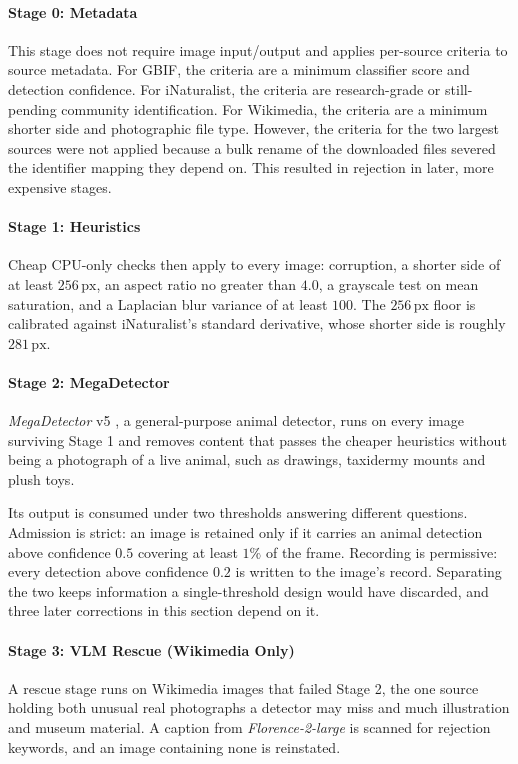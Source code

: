 \paragraph{Stage 0: Metadata}
This stage does not require image input/output and applies per-source criteria to source metadata. For GBIF, the criteria are a minimum classifier score and detection confidence. For iNaturalist, the criteria are research-grade or still-pending community identification. For Wikimedia, the criteria are a minimum shorter side and photographic file type. However, the criteria for the two largest sources were not applied because a bulk rename of the downloaded files severed the identifier mapping they depend on. This resulted in rejection in later, more expensive stages.

\paragraph{Stage 1: Heuristics}
Cheap CPU-only checks then apply to every image: corruption, a shorter side of at least $256\,\mathrm{px}$, an aspect ratio no greater than $4.0$, a grayscale test on mean saturation, and a Laplacian blur variance of at least $100$. The $256\,\mathrm{px}$ floor is calibrated against iNaturalist's standard derivative, whose shorter side is roughly $281\,\mathrm{px}$.

\paragraph{Stage 2: MegaDetector}
\textit{MegaDetector} v5 \cite{beeryEfficientPipelineCamera2019}, a general-purpose animal detector, runs on every image surviving Stage 1 and removes content that passes the cheaper heuristics without being a photograph of a live animal, such as drawings, taxidermy mounts and plush toys.

Its output is consumed under two thresholds answering different questions. Admission is strict: an image is retained only if it carries an animal detection above confidence $0.5$ covering at least $1\%$ of the frame. Recording is permissive: every detection above confidence $0.2$ is written to the image's record. Separating the two keeps information a single-threshold design would have discarded, and three later corrections in this section depend on it.

\paragraph{Stage 3: VLM Rescue (Wikimedia Only)}
A rescue stage runs on Wikimedia images that failed Stage 2, the one source holding both unusual real photographs a detector may miss and much illustration and museum material. A caption from \textit{Florence-2-large} \cite{xiaoFlorence2AdvancingUnified2023} is scanned for rejection keywords, and an image containing none is reinstated.

